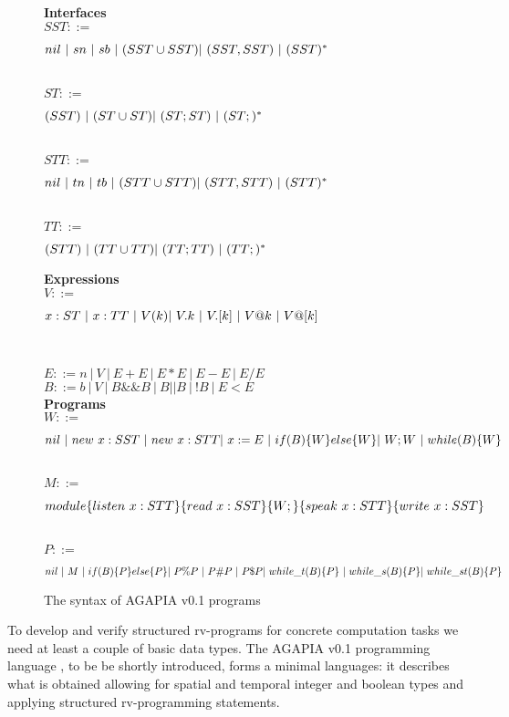 \documentclass[runningheads]{llncs}
\newcommand{\1}{\u{a}}
\newcommand{\2}{\c{s}}
\newcommand{\5}{\c{t}}
\newcommand{\8}{\^{\i}}
\newcommand{\9}{\^{a}}
\newcommand{\vsp}{\vspace{2ex}}
\newcommand{\svsp}{\vspace{1ex}}
\newcommand{\pvcomp}{\%}\newcommand{\phcomp}{\#}\newcommand{\pdcomp}{\$}
\begin{document}
\begin{figure}[t]\parbox[t]{7cm}{\footnotesize
{\bf Interfaces}\svsp\\
$SST::={}$ \parbox[t]{7cm}{$nil\ |\ sn\ |\ sb\ |\ (SST\cup SST)\\ |\ (SST,SST)\ |\
(SST)^*$}\svsp\\
$ST::={}$ \parbox[t]{7cm}{$ (SST)\ |\ (ST\cup ST)\\ |\ (ST;ST)\ |\ (ST;)^*$}\svsp\\
$STT::={}$ \parbox[t]{7cm}{$nil\ |\ tn\ |\ tb\ |\ (STT\cup STT)\\ |\ (STT,STT)\ |\
(STT)^*$}\svsp\\
$TT::= {}$ \parbox[t]{7cm}{$(STT)\ |\ (TT\cup TT)\\ |\ (TT;TT)\ |\ (TT;)^*$}\vsp

{\bf Expressions}\svsp\\
$V::={}$ \parbox[t]{7cm}{$ x:ST\ |\ x:TT\ |\ V(k)\\ |\ V.k\ |\ V.[k]\ |\ V@k\ |\ V@[k]$}\svsp\\
}\hspace*{-1.5cm}\parbox[t]{9cm}{\footnotesize
$E::= n\ |\ V\ |\ E+E\ |\ E*E\ |\ E-E\ |\ E/E$\svsp\\
$B::= b\ |\ V\ |\ B\&\& B\ |\ B||B\ |\ !B\ |\ E<E$\vsp\\
{\bf Programs}\svsp\\
$W::={}$ \parbox[t]{7cm}{$nil\ |\ new\ x:SST\ |\ new\ x:STT\\ |\ x := E\ |\ if (B) \{W\} else \{W\}
\\ |\ W;W\ |\ while (B) \{W\}$}\svsp\\
$M::={}$ \parbox[t]{7cm}{$module\{listen\ x:STT\}\{read\ x:SST\}\\
\{W;\}\{speak\ x:STT\}\{write\ x:SST\}$}\svsp\\
$P::={}$ \parbox[t]{7cm}{$nil\ |\ M\ |\ if (B) \{P\} else \{P\}\ \\ 
|\ P\pvcomp P\ |\ P\phcomp P\ |\ P\pdcomp P\ \\
|\ while\_t (B) \{P\}\ |\ while\_s (B) \{P\}\\ |\ while\_st (B) \{P\}$}}
\caption{The syntax of AGAPIA v0.1 programs}\label{f-agapia}
\end{figure}

To develop and verify structured rv-programs for concrete computation tasks we need at least a couple of basic
data types. The AGAPIA v0.1 programming language \cite{dr-st07b}, to be be shortly introduced, forms a minimal
languages: it describes what is obtained allowing for spatial and temporal integer and boolean types and
applying structured rv-programming statements.
\end{document}
